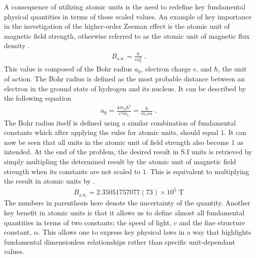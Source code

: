         A consequence of utilizing atomic units is the need to redefine key fundamental physical quantities in terms of these scaled values. An example of key importance in the investigation of the higher-order Zeeman effect is the atomic unit of magnetic field strength, otherwise referred to as the atomic unit of magnetic flux density \cite{Mohr_Newell_Taylor_Tiesinga_2024}.
        \begin{align}
            B_{\text{a.u.}} = \frac{\hbar}{e a_0^2}\;.\label{eq:B_au}
        \end{align}
        \noindent This value is composed of the Bohr radius $a_0$, electron charge $e$, and $\hbar$, the unit of action. The Bohr radius is defined as the most probable distance between an electron in the ground state of hydrogen and its nucleus. It can be described by the following equation \cite{Griffiths_2018}
        \begin{align}
            a_0 = \frac{4\pi \epsilon_0 \hbar^2}{e^2 m_e} = \frac{\hbar}{m_e c \alpha} \label{eq:bohr_radius}\;.
        \end{align}
        \noindent The Bohr radius itself is defined using a similar combination of fundamental constants which after applying the rules for atomic units, should equal $1$. It can now be seen that all units in the atomic unit of field strength also become $1$ as intended. At the end of the problem, the desired result in S.I units is retrieved by simply multipling the determined result by the atomic unit of magnetic field strength when its constants are not scaled to $1$. This is equivalent to multiplying the result in atomic units by \cite{Mohr_Newell_Taylor_Tiesinga_2024}.
        \begin{align}
            B_{\text{a.u.}} = 2.35051757077(73) \times 10^5 \text{ T}
        \end{align}
        \noindent The numbers in parenthesis here denote the uncertainty of the quantity. Another key benefit in atomic units is that it allows us to define almost all fundamental quantities in terms of two constants; the speed of light, $c$ and the fine structure constant, $\alpha$. This allows one to express key physical laws in a way that highlights fundamental dimensionless relationships rather than specific unit-dependant values.\\


